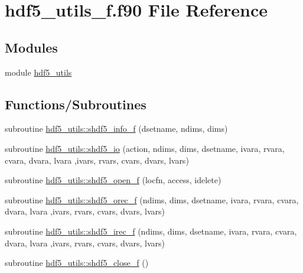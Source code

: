 \hypertarget{hdf5__utils__f_8f90}{}\section{hdf5\+\_\+utils\+\_\+f.\+f90 File Reference}
\label{hdf5__utils__f_8f90}
\subsection*{Modules}
\begin{DoxyCompactItemize}
\item 
module \hyperlink{namespacehdf5__utils}{hdf5\+\_\+utils}
\end{DoxyCompactItemize}
\subsection*{Functions/\+Subroutines}
\begin{DoxyCompactItemize}
\item 
subroutine \hyperlink{namespacehdf5__utils_a5149c551d73478f502b8660e3bdbd5b8}{hdf5\+\_\+utils\+::shdf5\+\_\+info\+\_\+f} (dsetname, ndims, dims)
\item 
subroutine \hyperlink{namespacehdf5__utils_ab16be1368bf81b1ead660310e178c07e}{hdf5\+\_\+utils\+::shdf5\+\_\+io} (action, ndims, dims, dsetname, ivara, rvara, cvara, dvara, lvara                                                                                                                                                                                       ,ivars, rvars, cvars, dvars, lvars)
\item 
subroutine \hyperlink{namespacehdf5__utils_ab621eee22271edfd3bf37b44d5b657e6}{hdf5\+\_\+utils\+::shdf5\+\_\+open\+\_\+f} (locfn, access, idelete)
\item 
subroutine \hyperlink{namespacehdf5__utils_a891a04f6033e6bcf3a91697ca1ab207b}{hdf5\+\_\+utils\+::shdf5\+\_\+orec\+\_\+f} (ndims, dims, dsetname, ivara, rvara, cvara, dvara, lvara                                                                                                                                                                   ,ivars, rvars, cvars, dvars, lvars)
\item 
subroutine \hyperlink{namespacehdf5__utils_a468d6b6ee8d5f6b95c49d383e6661ef6}{hdf5\+\_\+utils\+::shdf5\+\_\+irec\+\_\+f} (ndims, dims, dsetname, ivara, rvara, cvara, dvara, lvara                                                                                                                                                                   ,ivars, rvars, cvars, dvars, lvars)
\item 
subroutine \hyperlink{namespacehdf5__utils_aced9a0b34d2b1e59a1867be622a7c8a4}{hdf5\+\_\+utils\+::shdf5\+\_\+close\+\_\+f} ()
\end{DoxyCompactItemize}

